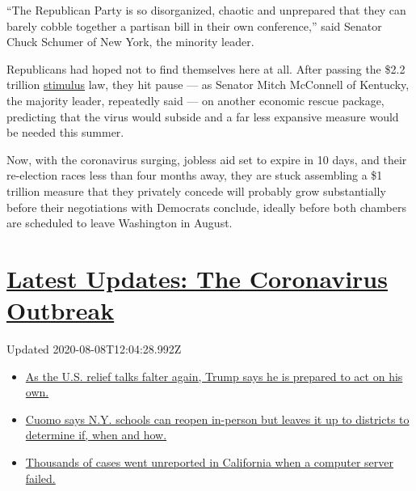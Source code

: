 ``The Republican Party is so disorganized, chaotic and unprepared that
they can barely cobble together a partisan bill in their own
conference,'' said Senator Chuck Schumer of New York, the minority
leader.

Republicans had hoped not to find themselves here at all. After passing
the \$2.2 trillion
\href{https://www.nytimes.com/2020/07/23/us/politics/republicans-stimulus-coronavirus.html}{stimulus}
law, they hit pause --- as Senator Mitch McConnell of Kentucky, the
majority leader, repeatedly said --- on another economic rescue package,
predicting that the virus would subside and a far less expansive measure
would be needed this summer.

Now, with the coronavirus surging, jobless aid set to expire in 10 days,
and their re-election races less than four months away, they are stuck
assembling a \$1 trillion measure that they privately concede will
probably grow substantially before their negotiations with Democrats
conclude, ideally before both chambers are scheduled to leave Washington
in August.

\hypertarget{latest-updates-the-coronavirus-outbreak}{%
\section{\texorpdfstring{\href{https://www.nytimes.com/2020/08/07/world/covid-19-news.html?action=click\&pgtype=Article\&state=default\&region=MAIN_CONTENT_1\&context=storylines_live_updates}{Latest
Updates: The Coronavirus
Outbreak}}{Latest Updates: The Coronavirus Outbreak}}\label{latest-updates-the-coronavirus-outbreak}}

Updated 2020-08-08T12:04:28.992Z

\begin{itemize}
\tightlist
\item
  \href{https://www.nytimes.com/2020/08/07/world/covid-19-news.html?action=click\&pgtype=Article\&state=default\&region=MAIN_CONTENT_1\&context=storylines_live_updates\#link-1f86d03a}{As
  the U.S. relief talks falter again, Trump says he is prepared to act
  on his own.}
\item
  \href{https://www.nytimes.com/2020/08/07/world/covid-19-news.html?action=click\&pgtype=Article\&state=default\&region=MAIN_CONTENT_1\&context=storylines_live_updates\#link-3f64a70a}{Cuomo
  says N.Y. schools can reopen in-person but leaves it up to districts
  to determine if, when and how.}
\item
  \href{https://www.nytimes.com/2020/08/07/world/covid-19-news.html?action=click\&pgtype=Article\&state=default\&region=MAIN_CONTENT_1\&context=storylines_live_updates\#link-14e70066}{Thousands
  of cases went unreported in California when a computer server failed.}
\end{itemize}


